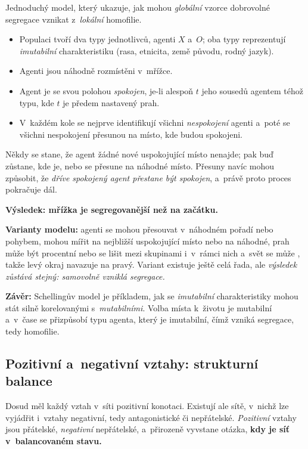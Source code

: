 \documentclass[11pt,a4paper]{article}
\theoremstyle{definition}
\begin{document}
\begin{defbox}
Jednoduchý model, který ukazuje, jak mohou \emph{globální} vzorce dobrovolné segregace vznikat
z~\emph{lokální} homofilie.
\begin{itemize}
\item Populaci tvoří dva typy jednotlivců, agenti $X$ a~$O$; oba typy reprezentují
      \emph{imutabilní} charakteristiku (rasa, etnicita, země původu, rodný jazyk).
\item Agenti jsou náhodně rozmístěni v~mřížce.
\item Agent je se svou polohou \emph{spokojen}, je-li alespoň $t$ jeho sousedů agentem téhož
      typu, kde $t$ je předem nastavený prah.
\item V~každém kole se nejprve identifikují všichni \emph{nespokojení} agenti a~poté se všichni
      nespokojení přesunou na místo, kde budou spokojeni.
\end{itemize}
Někdy se stane, že agent žádné nové uspokojující místo nenajde; pak buď zůstane, kde je, nebo
se přesune na náhodné místo. Přesuny navíc mohou způsobit, že \emph{dříve spokojený agent
přestane být spokojen}, a~právě proto proces pokračuje dál.

\textbf{Výsledek: mřížka je segregovanější než na začátku.}

\textbf{Varianty modelu:} agenti se mohou přesouvat v~náhodném pořadí nebo 
pohybem, mohou mířit na nejbližší uspokojující místo nebo na náhodné, prah může být procentní
nebo se lišit mezi skupinami i~v~rámci nich a~svět se může , takže levý okraj
navazuje na pravý. Variant existuje ještě celá řada, ale \emph{výsledek zůstává stejný:
samovolně vzniklá segregace.}

\textbf{Závěr:} Schellingův model je příkladem, jak se \emph{imutabilní} charakteristiky mohou
stát silně korelovanými s~\emph{mutabilními}. Volba místa k~životu je mutabilní a~v~čase se
přizpůsobí typu agenta, který je imutabilní, čímž vzniká segregace, tedy homofilie.
\end{defbox}

\subsection{Pozitivní a~negativní vztahy: strukturní balance}

Dosud měl každý vztah v~síti pozitivní konotaci. Existují ale sítě, v~nichž lze vyjádřit
i~vztahy negativní, tedy antagonistické či nepřátelské. \emph{Pozitivní} vztahy jsou přátelské,
\emph{negativní} nepřátelské, a~přirozeně vyvstane otázka, \textbf{kdy je síť v~balancovaném
stavu.}
\end{document}
